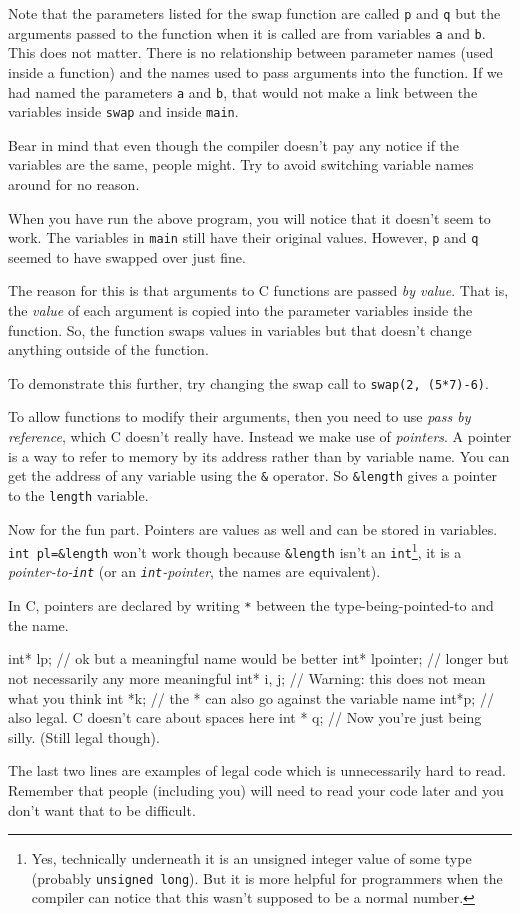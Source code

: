 Note that the parameters listed for the swap function are called \texttt{p} and \texttt{q} but the arguments passed to
the function when it is called are from variables \texttt{a} and \texttt{b}.
This does not matter. 
There is no relationship between parameter names (used inside a function) and the names used to pass arguments into 
the function.
If we had named the parameters \texttt{a} and \texttt{b}, that would not make a link between the variables inside \texttt{swap} 
and inside \texttt{main}.

Bear in mind that even though the compiler doesn't pay any notice if the variables are the same, people might.
Try to avoid switching variable names around for no reason.

When you have run the above program, you will notice that it doesn't seem to work.
The variables in \texttt{main} still have their original values.
However, \texttt{p} and \texttt{q} seemed to have swapped over just fine.

The reason for this is that arguments to C functions are passed \emph{by value}.
That is, the \emph{value} of each argument is copied into the parameter variables inside the function.
So, the function swaps values in variables but that doesn't change anything outside of the function.

To demonstrate this further, try changing the swap call to \lstinline!swap(2, (5*7)-6)!.

To allow functions to modify their arguments, then you need to use \emph{pass by reference}, which C doesn't really have.
Instead we make use of \emph{pointers}.
A pointer is a way to refer to memory by its address rather than by variable name.
You can get the address of any variable using the \lstinline!&! operator.
So \lstinline!&length! gives a pointer to the \texttt{length} variable.

Now for the fun part.
Pointers are values as well and can be stored in variables.
\lstinline!int pl=&length! won't work though because \lstinline!&length! isn't an \texttt{int}\footnote{Yes, technically underneath it is an unsigned integer value of some type (probably \texttt{unsigned long}).
But it is more helpful for programmers when the compiler can notice that this wasn't supposed to be a normal number.}, 
it is a \emph{pointer-to-\texttt{int}} (or an \emph{\texttt{int}-pointer}, the names are equivalent).

In C, pointers are declared by writing \texttt{*} between the type-being-pointed-to and the name.
\begin{codeblock}
int* lp; // ok but a meaningful name would be better
int* lpointer; // longer but not necessarily any more meaningful
int* i, j; // Warning: this does not mean what you think
int *k; // the * can also go against the variable name
int*p; // also legal. C doesn't care about spaces here
int * q; // Now you're just being silly. (Still legal though).
\end{codeblock}
The last two lines are examples of legal code which is unnecessarily hard to read.
Remember that people (including you) will need to read your code later and you don't want that to be difficult.

